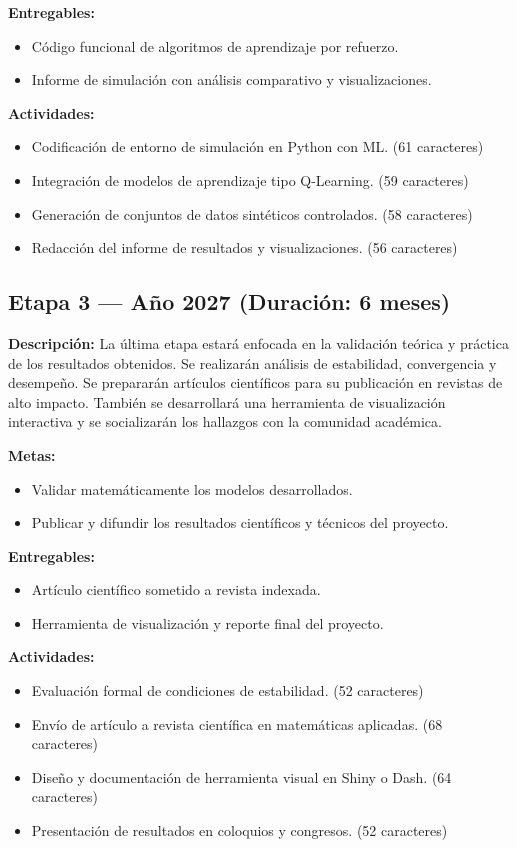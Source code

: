 \documentclass[12pt]{article}
\begin{document}
\textbf{Entregables:}
\begin{itemize}
  \item Código funcional de algoritmos de aprendizaje por refuerzo.
  \item Informe de simulación con análisis comparativo y visualizaciones.
\end{itemize}

\textbf{Actividades:}
\begin{itemize}
  \item Codificación de entorno de simulación en Python con ML. (61 caracteres)
  \item Integración de modelos de aprendizaje tipo Q-Learning. (59 caracteres)
  \item Generación de conjuntos de datos sintéticos controlados. (58 caracteres)
  \item Redacción del informe de resultados y visualizaciones. (56 caracteres)
\end{itemize}

\subsection*{Etapa 3 — Año 2027 (Duración: 6 meses)}
\textbf{Descripción:} La última etapa estará enfocada en la validación teórica y práctica de los resultados obtenidos. Se realizarán análisis de estabilidad, convergencia y desempeño. Se prepararán artículos científicos para su publicación en revistas de alto impacto. También se desarrollará una herramienta de visualización interactiva y se socializarán los hallazgos con la comunidad académica.

\textbf{Metas:}
\begin{itemize}
  \item Validar matemáticamente los modelos desarrollados.
  \item Publicar y difundir los resultados científicos y técnicos del proyecto.
\end{itemize}

\textbf{Entregables:}
\begin{itemize}
  \item Artículo científico sometido a revista indexada.
  \item Herramienta de visualización y reporte final del proyecto.
\end{itemize}

\textbf{Actividades:}
\begin{itemize}
  \item Evaluación formal de condiciones de estabilidad. (52 caracteres)
  \item Envío de artículo a revista científica en matemáticas aplicadas. (68 caracteres)
  \item Diseño y documentación de herramienta visual en Shiny o Dash. (64 caracteres)
  \item Presentación de resultados en coloquios y congresos. (52 caracteres)
\end{itemize}
\end{document}
